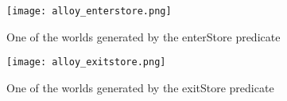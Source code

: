 \documentclass[../../main.tex]{subfiles}
\begin{document}
\begin{figure}[H]
  \centering
  \texttt{[image: alloy\_enterstore.png]}
  \caption{One of the worlds generated by the enterStore predicate}
\end{figure}

\begin{figure}[H]
  \centering
  \texttt{[image: alloy\_exitstore.png]}
  \caption{One of the worlds generated by the exitStore predicate}
\end{figure}
\end{document}
